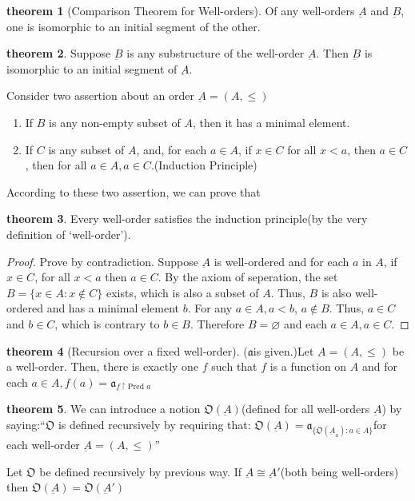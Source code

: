 \documentclass[a4paper,11pt]{article}%
\theoremstyle{remark}
\theoremstyle{definition}
\newtheorem{theorem}{theorem}[section]
\theoremstyle{definition}
\theoremstyle{plain}
\theoremstyle{definition}
\begin{document}
\begin{theorem}[Comparison Theorem for Well-orders]
   Of any well-orders $\underbar{A}$ and $\underbar{B}$, one is isomorphic to 
   an initial segment of the other. 
\end{theorem}
\begin{theorem}
    Suppose $\underbar{B}$ is any substructure of the well-order $\underbar{A}$.
    Then $\underbar{B}$ is isomorphic to an initial segment of $\underbar{A}$.
\end{theorem}
Consider two assertion about an order $\underbar{A}=(A,\leq)$
\begin{enumerate}
    \item If $B$ is any non-empty subset of $A$, then it has a minimal element.
    \item If $C$ is any subset of $A$, and, for each $a\in A$, if $x\in C$ for all $x<a$, then $a\in C$, then for all $a\in A,a\in C.$(Induction Principle)
\end{enumerate}
According to these two assertion, we can prove that 
\begin{theorem}
    Every well-order satisfies the induction principle(by the very definition of `well-order').
\end{theorem}
\begin{proof}
    Prove by contradiction.
    Suppose $\underbar{A}$ is well-ordered and for each $a$ in $A$,
    if $x\in C$, for all $x<a$ then $a\in C$. By the axiom of seperation,
    the set $B=\{x \in A:x \notin C\}$ exists, which is also a subset of $A$.
    Thus, $B$ is also well-ordered and has a minimal element $b$. For any $a\in A,a<b$,
    $a\notin B$. Thus, $a\in C$ and $b\in C$, which is contrary to $b\in B$.
    Therefore $B=\varnothing$ and each $a\in A,a\in C$.
\end{proof}
\begin{theorem}[Recursion over a fixed well-order]
   ($\mathfrak{a}$is given.)Let $\underbar{A}=(A,\leq)$  be a well-order. Then, there is exactly one
   $f$ such that $f$ is a function on $A$ and for each $a\in A,f(a)=\mathfrak{a}_{f\upharpoonright \text{Pred }a}$ 
\end{theorem}
\begin{theorem}
    We can introduce a notion $\mathfrak{O}(\underbar{A})$(defined for all 
    well-orders $\underbar{A}$) by saying:``$\mathfrak{O}$ is defined recursively by requiring that: $\mathfrak{O}(\underbar{A})=\mathfrak{a}_{\{\mathfrak{O}(\underbar{A}_a):a\in A\}}$for each well-order $\underbar{A}=(A,\leq)$''
    
    Let $\mathfrak{O}$ be defined recursively by previous way. If $\underbar{A}\cong\underbar{A}'$(both being well-orders)
    then $\mathfrak{O}(\underbar{A})=\mathfrak{O}(\underbar{A}')$
\end{theorem}
\end{document}
